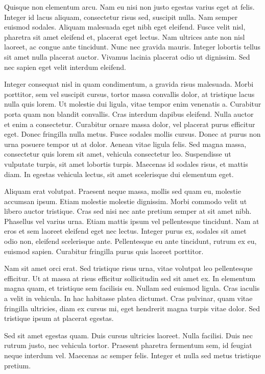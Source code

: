 \documentclass{homework}
\begin{document}
Quisque non elementum arcu. Nam eu nisi non justo egestas varius eget at felis. Integer id lacus aliquam, consectetur risus sed, suscipit nulla. Nam semper euismod sodales. Aliquam malesuada eget nibh eget eleifend. Fusce velit nisl, pharetra sit amet eleifend et, placerat eget lectus. Nam ultrices ante non nisl laoreet, ac congue ante tincidunt. Nunc nec gravida mauris. Integer lobortis tellus sit amet nulla placerat auctor. Vivamus lacinia placerat odio ut dignissim. Sed nec sapien eget velit interdum eleifend.

Integer consequat nisl in quam condimentum, a gravida risus malesuada. Morbi porttitor, sem vel suscipit cursus, tortor massa convallis dolor, at tristique lacus nulla quis lorem. Ut molestie dui ligula, vitae tempor enim venenatis a. Curabitur porta quam non blandit convallis. Cras interdum dapibus eleifend. Nulla auctor et enim a consectetur. Curabitur ornare massa dolor, vel placerat purus efficitur eget. Donec fringilla nulla metus. Fusce sodales mollis cursus. Donec at purus non urna posuere tempor ut at dolor. Aenean vitae ligula felis. Sed magna massa, consectetur quis lorem sit amet, vehicula consectetur leo. Suspendisse ut vulputate turpis, sit amet lobortis turpis. Maecenas id sodales risus, et mattis diam. In egestas vehicula lectus, sit amet scelerisque dui elementum eget.

Aliquam erat volutpat. Praesent neque massa, mollis sed quam eu, molestie accumsan ipsum. Etiam molestie molestie dignissim. Morbi commodo velit ut libero auctor tristique. Cras sed nisi nec ante pretium semper at sit amet nibh. Phasellus vel varius urna. Etiam mattis ipsum vel pellentesque tincidunt. Nam at eros et sem laoreet eleifend eget nec lectus. Integer purus ex, sodales sit amet odio non, eleifend scelerisque ante. Pellentesque eu ante tincidunt, rutrum ex eu, euismod sapien. Curabitur fringilla purus quis laoreet porttitor.

Nam sit amet orci erat. Sed tristique risus urna, vitae volutpat leo pellentesque efficitur. Ut at massa at risus efficitur sollicitudin sed sit amet ex. In elementum magna quam, et tristique sem facilisis eu. Nullam sed euismod ligula. Cras iaculis a velit in vehicula. In hac habitasse platea dictumst. Cras pulvinar, quam vitae fringilla ultricies, diam ex cursus mi, eget hendrerit magna turpis vitae dolor. Sed tristique ipsum at placerat egestas.

Sed sit amet egestas quam. Duis cursus ultricies laoreet. Nulla facilisi. Duis nec rutrum justo, nec vehicula tortor. Praesent pharetra fermentum sem, id feugiat neque interdum vel. Maecenas ac semper felis. Integer et nulla sed metus tristique pretium.
\end{document}
